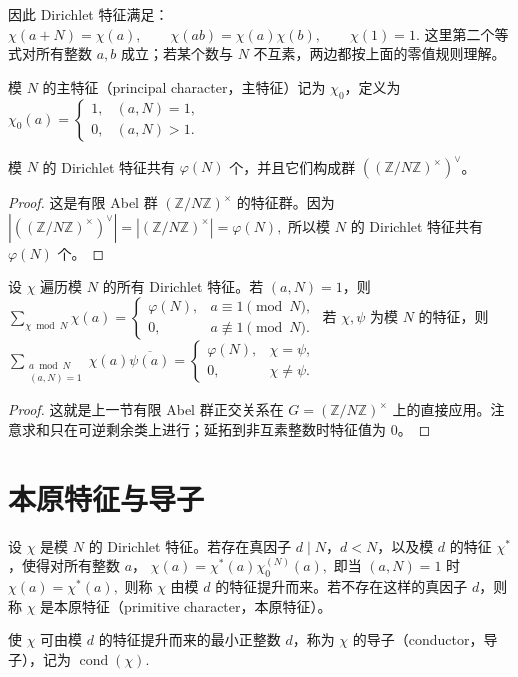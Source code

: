 \documentclass[oneside]{AJbook}
\newcommand{\Z}{\mathbb Z}
\newcommand{\U}[1]{(\Z/#1\Z)^\times}
\providecommand{\cond}{\operatorname{cond}}
\begin{document}
因此 Dirichlet 特征满足：
\(
  \chi(a+N)=\chi(a),\qquad
  \chi(ab)=\chi(a)\chi(b),\qquad
  \chi(1)=1.
\)
这里第二个等式对所有整数 $a,b$ 成立；若某个数与 $N$ 不互素，两边都按上面的零值规则理解。

\begin{definition}
模 $N$ 的主特征（principal character，主特征）记为 $\chi_0$，定义为
\(
  \chi_0(a)=
  \begin{cases}
    1,&(a,N)=1,\\
    0,&(a,N)>1.
  \end{cases}
\)
\end{definition}

\begin{proposition}
模 $N$ 的 Dirichlet 特征共有 $\varphi(N)$ 个，并且它们构成群 $(\U N)^\vee$。
\end{proposition}

\begin{proof}
这是有限 Abel 群 $\U N$ 的特征群。因为
\(
  |(\U N)^\vee|=|\U N|=\varphi(N),
\)
所以模 $N$ 的 Dirichlet 特征共有 $\varphi(N)$ 个。
\end{proof}

\begin{theorem}
设 $\chi$ 遍历模 $N$ 的所有 Dirichlet 特征。若 $(a,N)=1$，则
\(
  \sum_{\chi\bmod N}\chi(a)
  =
  \begin{cases}
    \varphi(N),& a\equiv 1\pmod N,\\
    0,& a\not\equiv 1\pmod N.
  \end{cases}
\)
若 $\chi,\psi$ 为模 $N$ 的特征，则
\(
  \sum_{\substack{a\bmod N\\(a,N)=1}}
  \chi(a)\overline{\psi(a)}
  =
  \begin{cases}
    \varphi(N),& \chi=\psi,\\
    0,& \chi\ne\psi.
  \end{cases}
\)
\end{theorem}

\begin{proof}
这就是上一节有限 Abel 群正交关系在
\(
  G=\U N
\)
上的直接应用。注意求和只在可逆剩余类上进行；延拓到非互素整数时特征值为 $0$。
\end{proof}

\section{本原特征与导子}

\begin{definition}
设 $\chi$ 是模 $N$ 的 Dirichlet 特征。若存在真因子 $d\mid N$，$d<N$，以及模 $d$ 的特征 $\chi^\ast$，使得对所有整数 $a$，
\(
  \chi(a)=\chi^\ast(a)\chi_0^{(N)}(a),
\)
即当 $(a,N)=1$ 时
\(
  \chi(a)=\chi^\ast(a),
\)
则称 $\chi$ 由模 $d$ 的特征提升而来。若不存在这样的真因子 $d$，则称 $\chi$ 是本原特征（primitive character，本原特征）。

使 $\chi$ 可由模 $d$ 的特征提升而来的最小正整数 $d$，称为 $\chi$ 的导子（conductor，导子），记为
\(
  \cond(\chi).
\)
\end{definition}
\end{document}
